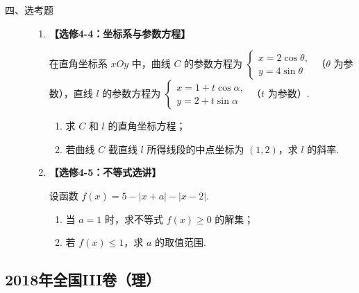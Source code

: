 \begin{description}

    \item[四、选考题]

    \begin{enumerate}[leftmargin=5pt]

      \addtocounter{enumi}{+21}

        \item \textbf{【选修4-4：坐标系与参数方程】}

在直角坐标系 \(xOy\) 中，曲线 \(C\) 的参数方程为
\(\begin{cases}
x=2\cos\theta,\\
y=4\sin\theta
\end{cases}\)
（\(\theta\) 为参数），直线 \(l\) 的参数方程为
\(\begin{cases}
x=1+t\cos\alpha,\\
y=2+t\sin\alpha
\end{cases}\)
（\(t\) 为参数）.

\begin{enumerate}
    \item 求 \(C\) 和 \(l\) 的直角坐标方程；
    \item 若曲线 \(C\) 截直线 \(l\) 所得线段的中点坐标为 \((1,2)\)，求 \(l\) 的斜率.
\end{enumerate}

        \item \textbf{【选修4-5：不等式选讲】}

设函数 \(f(x)=5-\lvert x+a\rvert-\lvert x-2\rvert\).

\begin{enumerate}
    \item 当 \(a=1\) 时，求不等式 \(f(x)\ge0\) 的解集；
    \item 若 \(f(x)\le1\)，求 \(a\) 的取值范围.
\end{enumerate}

    \end{enumerate}

\end{description}


\subsection{2018年全国III卷（理）}\label{gk:2018年全国III卷（理）}

